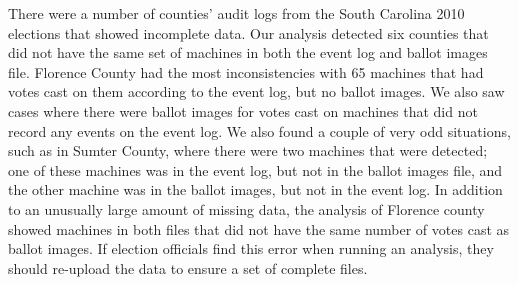 There were a number of counties' audit logs from the South Carolina 2010 elections that showed incomplete data.  Our analysis detected six counties that did not have the same set of machines in both the event log and ballot images file.  Florence County had the most inconsistencies with 65 machines that had votes cast on them according to the event log, but no ballot images.  We also saw cases where there were ballot images for votes cast on machines that did not record any events on the event log.  We also found a couple of very odd situations, such as in Sumter County, where there were two machines that were detected; one of these machines was in the event log, but not in the ballot images file, and the other machine was in the ballot images, but not in the event log.  In addition to an unusually large amount of missing data, the analysis of Florence county showed machines in both files that did not have the same number of votes cast as ballot images.  If election officials find this error when running an analysis,  they should re-upload the data to ensure a set of complete files.
